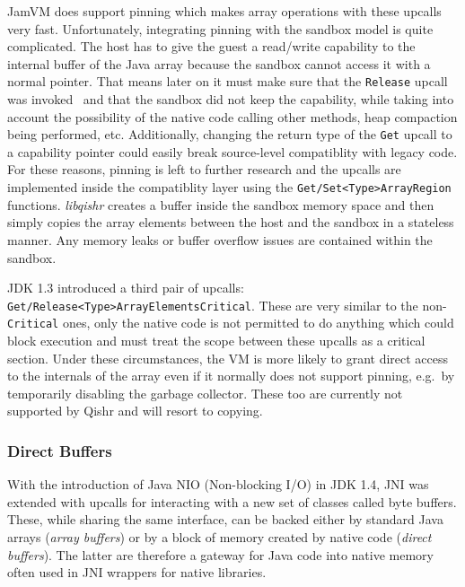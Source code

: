 \documentclass[a4paper,12pt,twoside,openright]{report}
\newcommand{\tool}[1]{\emph{#1}}
\newcommand{\lib}[1]{\tool{lib#1}}
\begin{document}
JamVM does support pinning which makes array operations with these upcalls very fast. Unfortunately, integrating pinning with the sandbox model is quite complicated. The host has to give the guest a read/write capability to the internal buffer of the Java array because the sandbox cannot access it with a normal pointer. That means later on it must make sure that the \texttt{Release} upcall was invoked~\cite{Kondoh:2008:FBJ:1390630.1390645} and that the sandbox did not keep the capability, while taking into account the possibility of the native code calling other methods, heap compaction being performed, etc. Additionally, changing the return type of the \texttt{Get} upcall to a capability pointer could easily break source-level compatiblity with legacy code. For these reasons, pinning is left to further research and the upcalls are implemented inside the compatiblity layer using the \texttt{Get/Set\-<Type>\-Array\-Region} functions. \lib{qishr} creates a buffer inside the sandbox memory space and then simply copies the array elements between the host and the sandbox in a stateless manner. Any memory leaks or buffer overflow issues are contained within the sandbox.

\label{ArraysCriticalSection}
JDK 1.3 introduced a third pair of upcalls: \texttt{Get/Release\-<Type>\-Array\-ElementsCritical}. These are very similar to the non-\texttt{Critical} ones, only the native code is not permitted to do anything which could block execution and must treat the scope between these upcalls as a critical section. Under these circumstances, the VM is more likely to grant direct access to the internals of the array even if it normally does not support pinning, e.g.\ by temporarily disabling the garbage collector. These too are currently not supported by Qishr and will resort to copying.

\subsubsection{Direct Buffers}
\label{sec:DirectBuffers}

With the introduction of Java NIO (Non-blocking I/O) in JDK 1.4, JNI was extended with upcalls for interacting with a new set of classes called byte buffers. These, while sharing the same interface, can be backed either by standard Java arrays (\emph{array buffers}) or by a block of memory created by native code (\emph{direct buffers}). The latter are therefore a gateway for Java code into native memory often used in JNI wrappers for native libraries.
\end{document}
